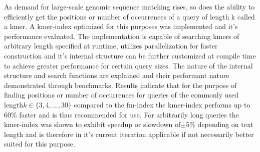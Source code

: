 \author{Clemens~Cords}
\newcommand{\matrikelno}{4872639}
\newcommand{\email}{clemens.cords@fu-berlin.de}

\newcommand{\supervisor}{TODO~TODO}
\newcommand{\supervisorUniversity}{Freie Universität Berlin}
\newcommand{\supervisorDepartment}{Dept. of Computer Science and Mathematics}
\newcommand{\supervisorAG}{TODO}
\newcommand{\supervisorCountry}{Germany}

\newcommand{\fstAdvisor}{TODO~TODO}
\newcommand{\fstAdvisorsUniversity}{Freie Universität Berlin}
\newcommand{\fstAdvisorsDepartment}{Dept. of Computer Science and Mathematics}
\newcommand{\fstAdvisorsAG}{TODO}
\newcommand{\fstAdvisorsCountry}{Germany}

\newcommand{\sndAdvisor}{TODO~TODO}
\newcommand{\sndAdvisorsUniversity}{Freie Universität Berlin} %
\newcommand{\sndAdvisorsDepartment}{Dept. of Computer Science and Mathematics}
\newcommand{\sndAdvisorsAG}{TODO}
\newcommand{\sndAdvisorsCountry}{Germany}



\begin{abstractEN}
As demand for large-scale genomic sequence matching rises, so does
the ability to efficiently get the positions or number of occurrences
of a query of length k called a kmer. A kmer-index optimized for this
purposes was implemented and it's performance evaluated. The implementation
is capable of searching kmers of arbitrary length specified at runtime,
utilizes parallelization for faster construction and it's internal
structure can be further customized at compile time to achieve greater
performance for certain query sizes. The nature of the internal structure
and search functions are explained and their performant nature demonstrated
through benchmarks. Results indicate that for the purpose of finding
positions or number of occurrences for queries of the commonly used
length$k\in\{3,4,...,30\}$ compared to the fm-index the kmer-index
performs up to 60\% faster and is thus recommended for use. For arbitrarily
long queries the kmer-index was shown to exhibit speedup or slowdown
of$\pm5$\% depending on text length and is therefore in it's current
iteration applicable if not necessarily better suited for this purpose.
\end{abstractEN}
\vfill

